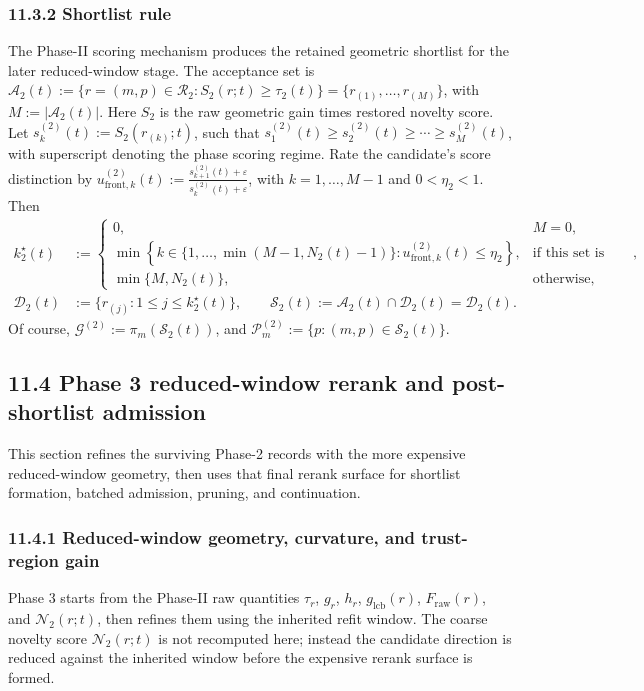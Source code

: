 \documentclass[11pt]{article}
\begin{document}
\subsubsection*{11.3.2 Shortlist rule}
The Phase-II scoring mechanism produces the retained geometric shortlist for the later reduced-window stage. The acceptance set is \(\mathcal A_2(t):=\{r=(m,p)\in\mathcal R_2:S_2(r;t)\ge \tau_2(t)\}=\{r_{(1)},\dots,r_{(M)}\}\), with \(M:=|\mathcal A_2(t)|\). Here \(S_2\) is the raw geometric gain times restored novelty score. Let \(s_k^{(2)}(t):=S_2(r_{(k)};t)\), such that \(s^{(2)}_1(t)\ge s^{(2)}_2(t)\ge\cdots\ge s^{(2)}_M(t)\), with superscript denoting the phase scoring regime. Rate the candidate's score distinction by \(u_{\mathrm{front},k}^{(2)}(t):=\frac{s^{(2)}_{k+1}(t)+\varepsilon}{s^{(2)}_{k}(t)+\varepsilon}\), with \(k=1,\dots,M-1\) and \(0<\eta_2<1\). Then
\[
\begin{aligned}
k_2^\star(t)&:=
\begin{cases}
0, & M=0,\\[4pt]
\min\!\left\{k\in\{1,\dots,\min(M-1,N_2(t)-1)\}:u_{\mathrm{front},k}^{(2)}(t)\le \eta_2\right\},
& \text{if this set is nonempty},\\[6pt]
\min\{M,N_2(t)\}, & \text{otherwise},
\end{cases}\\
\mathcal D_2(t)&:=\{r_{(j)}:1\le j\le k_2^\star(t)\},
\qquad
\mathcal S_2(t):=\mathcal A_2(t)\cap \mathcal D_2(t)=\mathcal D_2(t).
\end{aligned}
\]
Of course, \(\mathcal G^{(2)}:=\pi_m(\mathcal S_2(t))\), and \(\mathcal P_m^{(2)}:=\{p:(m,p)\in\mathcal S_2(t)\}\).

\subsection*{11.4 Phase 3 reduced-window rerank and post-shortlist admission}
This section refines the surviving Phase-2 records with the more expensive reduced-window geometry, then uses that final rerank surface for shortlist formation, batched admission, pruning, and continuation.

\subsubsection*{11.4.1 Reduced-window geometry, curvature, and trust-region gain}
Phase 3 starts from the Phase-II raw quantities \(\tau_r\), \(g_r\), \(h_r\), \(g_{\mathrm{lcb}}(r)\), \(F_{\mathrm{raw}}(r)\), and \(\mathcal N_2(r;t)\), then refines them using the inherited refit window. The coarse novelty score \(\mathcal N_2(r;t)\) is not recomputed here; instead the candidate direction is reduced against the inherited window before the expensive rerank surface is formed.
\end{document}
